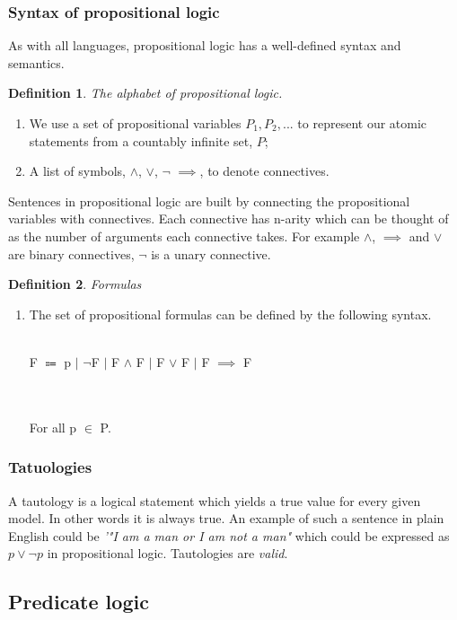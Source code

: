 \documentclass{article}%
\newtheorem{definition}{Definition}
\begin{document}
\subsubsection{Syntax of propositional logic}
As with all languages, propositional logic has a well-defined syntax and semantics. 
\begin{definition}
The alphabet of propositional logic.
\end{definition}
\begin{enumerate}
\item We use a set of propositional variables $P_1, P_2, ... $ to represent our atomic statements from a countably infinite set, $P$;
\item A list of symbols, $\land$, $\lor$, $\neg$  $\implies$, to denote connectives.
\end{enumerate}

Sentences in propositional logic are built by connecting the propositional variables with connectives. Each connective has n-arity which can be thought of as the number of arguments each connective takes. For example $\land$, $\implies$ and $\lor$ are binary connectives, $\neg$ is a unary connective. 
\begin{definition}
Formulas
\end{definition}
\begin{enumerate}
\item The set of propositional formulas can be defined by the following syntax.\\\\
\centerline{ F $\Coloneqq$ p $\vert$  $\neg$F $\vert$  F $\land$ F $\vert$  F $\lor$ F $\vert$ F $\implies$ F } \\\\
For all p $\in$ P.
\end{enumerate}
\subsubsection{Tatuologies}
A tautology is a logical statement which yields a true value for every given model. In other words it is always true. An example of such a sentence in plain English could be \textit{'"I am a man or I am not a man"} which could be expressed as $p \lor \neg{p}$ in propositional logic. Tautologies are \textit{valid}. 


\subsection{Predicate logic}
\end{document}
